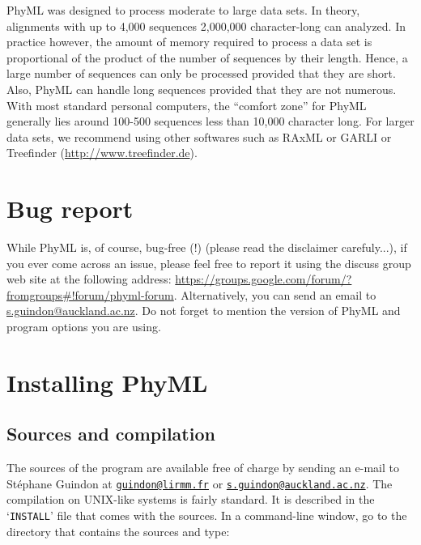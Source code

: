 \documentclass[a4paper,12pt]{article}
\newcommand{\x}[1]{\texttt{#1}}
\begin{document}
PhyML was designed to  process moderate to large data sets.  In theory,  alignments with up to 4,000
sequences 2,000,000 character-long can analyzed.  In practice however, the amount of memory required
to process  a data set is proportional  of the product of  the number of sequences  by their length.
Hence, a large number  of sequences can only be processed provided that  they are short. Also, PhyML
can  handle long  sequences  provided  that they  are  not numerous.   With  most standard  personal
computers, the ``comfort  zone'' for PhyML generally lies around 100-500  sequences less than 10,000
character  long.   For  larger  data  sets,  we  recommend  using  other  softwares  such  as  RAxML
\cite{raxml}      or       GARLI      \cite{garli}      or      Treefinder
(\href{http://www.treefinder.de}{http://www.treefinder.de}).


\section{Bug report}

While PhyML is, of  course, bug-free (!) (please read the disclaimer  carefuly...), if you ever come
across an  issue, please feel free to  report it using the  discuss group web site  at the following
address:  \url{https://groups.google.com/forum/?fromgroups#!forum/phyml-forum}.  Alternatively,  you
can send an email  to \url{s.guindon@auckland.ac.nz}. Do not forget to mention  the version of PhyML
and program options you are using.


\section{Installing PhyML}

\subsection{Sources and compilation}

The sources of the  program are available free of charge by sending  an e-mail to St\'ephane Guindon
at                      \href{mailto:guindon@lirmm.fr}{\x{guindon@lirmm.fr}}                      or
\href{mailto:s.guindon@auckland.ac.nz}{\x{s.guindon@auckland.ac.nz}}.  The  compilation on UNIX-like
systems  is  fairly standard.  It  is  described  in the  `\x{INSTALL}'  file  that comes  with  the
sources. In a command-line window, go to the directory that contains the sources and type:
\end{document}
